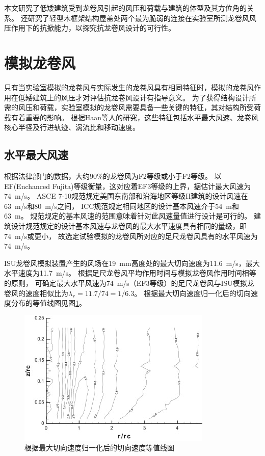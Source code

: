 \documentclass{ctexart}
\begin{document}
本文研究了低矮建筑受到龙卷风引起的风压和荷载与建筑的体型及其方位角的关系。
还研究了轻型木框架结构屋盖处两个最为脆弱的连接在实验室所测龙卷风风压作用下的抗掀能力，以探究抗龙卷风设计的可行性。

\section{模拟龙卷风}
只有当实验室模拟的龙卷风与实际发生的龙卷风具有相同特征时，模拟的龙卷风作用在低矮建筑上的风压才对评估抗龙卷风设计有指导意义。
为了获得结构设计所需的风压和荷载，实验室模拟的龙卷风需要具备一些关键的特征，其对结构所受荷载有着重要的影响。
根据Haan等人\cite{haan2009tornado}的研究，这些特征包括水平最大风速、龙卷风核心半径及行进轨迹、涡流比和移动速度。

\subsection{水平最大风速}
根据法律部门的数据，大约$90 \%$的龙卷风为F2等级或小于F2等级\cite{bluestein1993review}。
以EF(Enchanced Fujita)\cite{marshall2004enhanced}等级衡量，这对应着EF3等级的上界，据估计最大风速为\SI{74}{m/s}。
ASCE 7-10规范\cite{american1994minimum}规定美国东南部和沿海地区等级II建筑的设计风速在\SI{63}{m/s}和\SI{80}{m/s}之间，
ICC规范\cite{ibc2012international}规定相同地区的设计基本风速介于\SI{54}{m}和\SI{63}{m}。
规范规定的基本风速的范围意味着针对此风速量值进行设计是可行的。
建筑设计规范规定的设计基本风速与龙卷风的最大水平速度具有相同的量级，即\SI{74}{m/s}或更小，
故选定试验模拟的龙卷风所对应的足尺龙卷风具有的水平风速为\SI{74}{m/s}。

ISU龙卷风模拟装置产生的风场在\SI{19}{mm}高度处的最大切向速度为\SI{11.6}{m/s}，最大水平速度为\SI{11.7}{m/s}。
根据足尺龙卷风平均作用时间与模拟龙卷风作用时间相等的原则，
可确定最大水平风速为\SI{74}{m/s}（EF3等级）的足尺龙卷风与ISU模拟龙卷风的速度相似比为$\lambda_{\mathrm{v}}=11.7/74=1/6.3$。
根据最大切向速度归一化后的切向速度分布的等值线图见图\ref{fig:Vt-contour}。 

\begin{figure}
\centering
\includegraphics{./fig/1.jpg}
\caption{根据最大切向速度归一化后的切向速度等值线图}
\label{fig:Vt-contour}
\end{figure}
\end{document}
